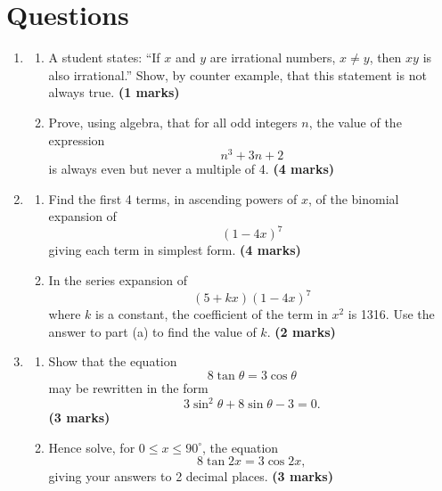 \documentclass{../Templates/sbs-exam}
\newcommand{\imarks}[1]{\hfill \textbf{(#1 marks)}}
\begin{document}
\maketitle

\examnotice

\makemarksheet

\examtools

\newpage

\makeatletter

\section*{Questions}

\begin{enumerate}

\item %
\begin{enumerate}
    \item[(i)] A student states: “If $x$ and $y$ are irrational numbers, $x \neq y$, then $xy$ is also irrational.” Show, by counter example, that this statement is not always true. \imarks{1}
    \item[(ii)] Prove, using algebra, that for all odd integers $n$, the value of the expression
    \[
    n^{3}+3n+2
    \]
    is always even but never a multiple of 4. \imarks{4}
\end{enumerate}

\newpage

\item %
\begin{enumerate}
    \item[(a)] Find the first 4 terms, in ascending powers of $x$, of the binomial expansion of 
    \[
    (1-4x)^7
    \]
    giving each term in simplest form. \imarks{4}
    \item[(b)] In the series expansion of 
    \[
    (5+kx)(1-4x)^7
    \]
    where $k$ is a constant, the coefficient of the term in $x^{2}$ is 1316. Use the answer to part (a) to find the value of $k$. \imarks{2}
\end{enumerate}

\newpage

\item %
\begin{enumerate}
    \item[(a)] Show that the equation
    \[
    8\tan\theta = 3\cos\theta
    \]
    may be rewritten in the form
    \[
    3\sin^{2}\theta + 8\sin\theta - 3 = 0.
    \] \imarks{3}
    \item[(b)] Hence solve, for $0 \leq x \leq 90^{\circ}$, the equation
    \[
    8\tan 2x = 3\cos 2x,
    \]
    giving your answers to 2 decimal places. \imarks{3}
\end{enumerate}


\end{enumerate}
\end{document}
